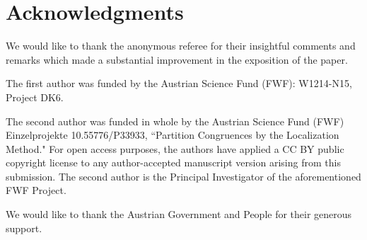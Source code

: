 \documentclass[reqno]{amsart}
\theoremstyle{definition}
\theoremstyle{remark}
\numberwithin{equation}{section}
\begin{document}
\section{Acknowledgments}
We would like to thank the anonymous referee for their insightful comments and remarks which made a substantial improvement in the exposition of the paper.

The first author was funded by the Austrian Science Fund (FWF): W1214-N15, Project DK6.  

The second author was funded in whole by the Austrian Science Fund (FWF) Einzelprojekte 10.55776/P33933, ``Partition Congruences by the Localization Method."  For open access purposes, the authors have applied a CC BY public copyright license to any author-accepted manuscript version arising from this submission.  The second author is the Principal Investigator of the aforementioned FWF Project.

We would like to thank the Austrian Government and People for their generous support.
\end{document}
